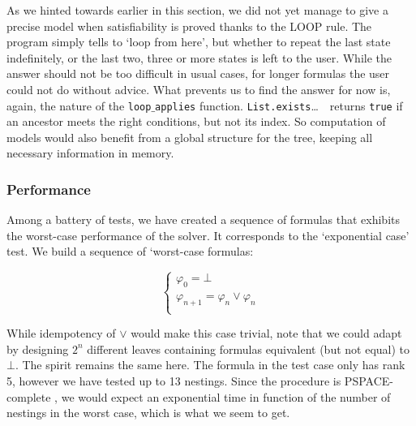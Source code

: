 \documentclass[11pt]{article}
\newcommand{\orr}{{\vee}}
\newcommand{\phii}{{\varphi}}
\theoremstyle{definition}
\begin{document}
As we hinted towards earlier in this section, 
we did not yet manage to give a precise model when satisfiability is proved thanks to the LOOP rule. The program simply tells 
to `loop from here', but whether to repeat the last state indefinitely, or the last two, three or more
states is left to the user.
While the answer should not be too difficult in usual cases, for longer formulas 
the user could not do without advice. What prevents us to find the answer for now is, again, the nature 
of the {\tt loop$\_$applies} function. {\tt List.exists}\ldots $\mbox{ }$ returns {\tt true} if an ancestor meets the right conditions,
but not its index. So computation of models would also benefit from a global structure for the tree,
keeping all necessary information
in memory. 

\subsubsection*{Performance}
Among a battery of tests, we have created a sequence of formulas that exhibits the worst-case performance of the solver. 
It corresponds to the `exponential case' test. We build a sequence of `worst-case formulas:

\begin{equation*}
    \begin{cases}
        \phii_0=\bot\\
        \phii_{n+1}=\phii_n\orr\phii_n\\
    \end{cases}
\end{equation*}

While idempotency of $\orr$ would make this case trivial, note that we could adapt by designing $2^n$ different leaves containing formulas equivalent
(but not equal) to $\bot$. The spirit remains the same here.
The formula in the test case only has rank 5, however we have tested up to 13 nestings. 
Since the procedure is PSPACE-complete \cite[Section 9]{ReyLTL}, 
we would expect an exponential time in function of the number of nestings in the worst case, 
which is what we seem to get. 
\end{document}
